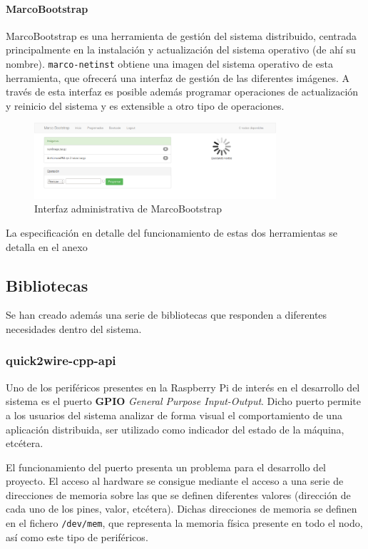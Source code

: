 \paragraph{MarcoBootstrap\\}

MarcoBootstrap es una herramienta de gestión del sistema distribuido, centrada principalmente en la instalación y actualización del sistema operativo (de ahí su nombre). \texttt{marco-netinst} obtiene una imagen del sistema operativo de esta herramienta, que ofrecerá una interfaz de gestión de las diferentes imágenes. A través de esta interfaz es posible además programar operaciones de actualización y reinicio del sistema y es extensible a otro tipo de operaciones.

\begin{figure}[H]
	\centering
	\includegraphics[width=0.8\textwidth]{Chapters/Chapter5/Figures/marcobootstrap}
	\caption{Interfaz administrativa de MarcoBootstrap}
\end{figure}

La especificación en detalle del funcionamiento de estas dos herramientas se detalla en el anexo\citationneeded[TODO]

\subsection{Bibliotecas}

Se han creado además una serie de bibliotecas que responden a diferentes necesidades dentro del sistema.

\subsubsection{quick2wire-cpp-api}

Uno de los periféricos presentes en la Raspberry Pi de interés en el desarrollo del sistema es el puerto \textbf{GPIO} \textit{General Purpose Input-Output}. Dicho puerto permite a los usuarios del sistema analizar de forma visual el comportamiento de una aplicación distribuida, ser utilizado como indicador del estado de la máquina, etcétera.

El funcionamiento del puerto presenta un problema para el desarrollo del proyecto. El acceso al hardware se consigue mediante el acceso a una serie de direcciones de memoria sobre las que se definen diferentes valores (dirección de cada uno de los pines, valor, etcétera). Dichas direcciones de memoria se definen en el fichero \texttt{/dev/mem}, que representa la memoria física presente en todo el nodo, así como este tipo de periféricos.

